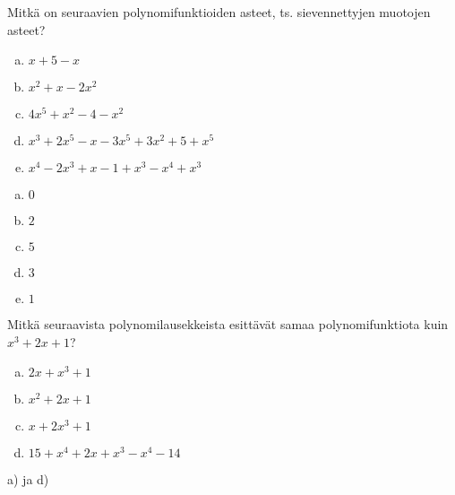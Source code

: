 \begin{tehtava}
	Mitkä on seuraavien polynomifunktioiden asteet, ts. sievennettyjen muotojen asteet?
	\begin{enumerate}[a)]
		\item $x+5-x$
		\item $x^2+x-2x^2$
		\item $4x^5+x^2-4-x^2$
		\item $x^3+2x^5-x-3x^5+3x^2+5+x^5$
		\item $x^4-2x^3+x-1+x^3-x^4+x^3$
	\end{enumerate}

	\begin{vastaus}
		\begin{enumerate}[a)]
			\item $0$
			\item $2$
			\item $5$
			\item $3$
			\item $1$
		\end{enumerate}
	\end{vastaus}
\end{tehtava}

%

\begin{tehtava}
	Mitkä seuraavista polynomilausekkeista esittävät samaa polynomifunktiota kuin
	$x^3+2x+1$?
	\begin{enumerate}[a)]
		\item $2x+x^3+1$
		\item $x^2+2x+1$
		\item $x+2x^3+1$
		\item $15+x^4+2x+x^3-x^4-14$
	\end{enumerate}
	\begin{vastaus}
		a) ja d)
	\end{vastaus}
\end{tehtava}
